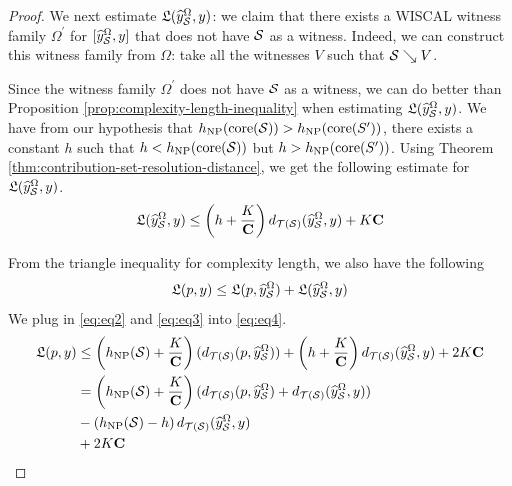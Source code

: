 \documentclass[12pt, reqno]{amsart}
\begin{document}
\begin{proof}
We next estimate $\mathfrak{L}(\widehat{y}_{\mathcal{S}}^{\Omega}, y)$: we claim that there exists a WISCAL witness family $\Omega^{\prime}$ for $[\widehat{y}_{\mathcal{S}}^{\Omega}, y]$ that does not have $\mathcal{S}$ as a witness.
Indeed, we can construct this witness family from $\Omega$: take all the witnesses $V$ such that $\mathcal{S} \searrow V$.

Since the witness family $\Omega^{\prime}$ does not have $\mathcal{S}$ as a witness, we can do better than Proposition \ref{prop:complexity-length-inequality} when estimating $\mathfrak{L}(\widehat{y}_{\mathcal{S}}^{\Omega}, y)$.
We have from our hypothesis that $h_{\mathrm{NP}}(\mathrm{core}(\mathcal{S})) > h_{\mathrm{NP}}(\mathrm{core}(S^{\prime}))$, there exists a constant $h$ such that $h < h_{\mathrm{NP}}(\mathrm{core}(\mathcal{S}))$ but $h > h_{\mathrm{NP}}(\mathrm{core}(S^{\prime}))$.
Using Theorem \ref{thm:contribution-set-resolution-distance}, we get the following estimate for $\mathfrak{L}(\widehat{y}_{\mathcal{S}}^{\Omega}, y)$.
\begin{align}
  \label{eq:eq3}
\mathfrak{L}(\widehat{y}_{\mathcal{S}}^{\Omega}, y) \leq \left( h + \frac{K}{\mathbf{C}} \right) d_{\mathcal{T}(\mathcal{S})}(\widehat{y}_{\mathcal{S}}^{\Omega}, y) + K \mathbf{C}
\end{align}

From the triangle inequality for complexity length, we also have the following
\begin{align}
  \label{eq:eq4}
  \mathfrak{L}(p, y) \leq \mathfrak{L}(p, \widehat{y}_{\mathcal{S}}^{\Omega}) + \mathfrak{L}(\widehat{y}_{\mathcal{S}}^{\Omega}, y)
\end{align}
We plug in \eqref{eq:eq2} and \eqref{eq:eq3} into \eqref{eq:eq4}.
\begin{align*}
  \mathfrak{L}(p, y) &\leq \left( h_{\mathrm{NP}}(\mathcal{S}) + \frac{K}{\mathbf{C}} \right) (d_{\mathcal{T}(\mathcal{S})}(p, \widehat{y}_{\mathcal{S}}^{\Omega})) + \left( h + \frac{K}{\mathbf{C}} \right) d_{\mathcal{T}(\mathcal{S})}(\widehat{y}_{\mathcal{S}}^{\Omega}, y) +  2K \mathbf{C} \\
                     &= \left( h_{\mathrm{NP}}(\mathcal{S}) + \frac{K}{\mathbf{C}} \right) (d_{\mathcal{T}(\mathcal{S})}(p, \widehat{y}_{\mathcal{S}}^{\Omega}) + d_{\mathcal{T}(\mathcal{S})}(\widehat{y}_{\mathcal{S}}^{\Omega}, y)) \\
                     &- \left( h_{\mathrm{NP}}(\mathcal{S}) - h \right) d_{\mathcal{T}(\mathcal{S})}(\widehat{y}_{\mathcal{S}}^{\Omega}, y) \\
  &+  2K \mathbf{C}
\end{align*}


\end{proof}
\end{document}
